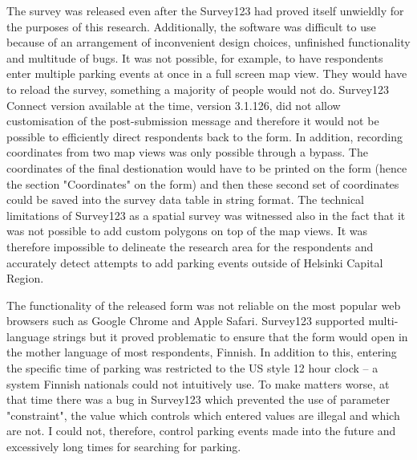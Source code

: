 The survey was released even after the Survey123 had proved itself unwieldly for the purposes of this research. Additionally, the software was difficult to use because of an arrangement of inconvenient design choices, unfinished functionality and multitude of bugs. It was not possible, for example, to have respondents enter multiple parking events at once in a full screen map view. They would have to reload the survey, something a majority of people would not do. Survey123 Connect version available at the time, version 3.1.126, did not allow customisation of the post-submission message and therefore it would not be possible to efficiently direct respondents back to the form. In addition, recording coordinates from two map views was only possible through a bypass. The coordinates of the final destionation would have to be printed on the form (hence the section "Coordinates" on the form) and then these second set of coordinates could be saved into the survey data table in string format. The technical limitations of Survey123 as a spatial survey was witnessed also in the fact that it was not possible to add custom polygons on top of the map views. It was therefore impossible to delineate the research area for the respondents and accurately detect attempts to add parking events outside of Helsinki Capital Region.

The functionality of the released form was not reliable on the most popular web browsers such as Google Chrome and Apple Safari. Survey123 supported multi-language strings but it proved problematic to ensure that the form would open in the mother language of most respondents, Finnish. In addition to this, entering the specific time of parking was restricted to the US style 12 hour clock -- a system Finnish nationals could not intuitively use. To make matters worse, at that time there was a bug in Survey123 which prevented the use of parameter "constraint", the value which controls which entered values are illegal and which are not. I could not, therefore, control parking events made into the future and excessively long times for searching for parking.

